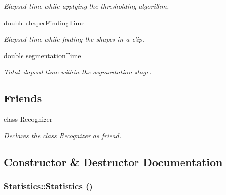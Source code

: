 \begin{CompactItemize}
\begin{CompactList}\small\item\em Elapsed time while applying the thresholding algorithm. \item\end{CompactList}\item 
\hypertarget{class_statistics_902172424d5011a89726319dfd32fa19}{
double \hyperlink{class_statistics_902172424d5011a89726319dfd32fa19}{shapesFindingTime\_\-}}
\label{class_statistics_902172424d5011a89726319dfd32fa19}

\begin{CompactList}\small\item\em Elapsed time while finding the shapes in a clip. \item\end{CompactList}\item 
\hypertarget{class_statistics_89ff84bd9b9b80585822c461ec25c8eb}{
double \hyperlink{class_statistics_89ff84bd9b9b80585822c461ec25c8eb}{segmentationTime\_\-}}
\label{class_statistics_89ff84bd9b9b80585822c461ec25c8eb}

\begin{CompactList}\small\item\em Total elapsed time within the segmentation stage. \item\end{CompactList}\end{CompactItemize}
\subsection*{Friends}
\begin{CompactItemize}
\item 
\hypertarget{class_statistics_11123fa51c07995419270030024a7dfe}{
class \hyperlink{class_statistics_11123fa51c07995419270030024a7dfe}{Recognizer}}
\label{class_statistics_11123fa51c07995419270030024a7dfe}

\begin{CompactList}\small\item\em Declares the class \hyperlink{class_recognizer}{Recognizer} as friend. \item\end{CompactList}\end{CompactItemize}


\subsection{Constructor \& Destructor Documentation}
\hypertarget{class_statistics_60ddd90a571ed4c3ce8c0f6317a36d63}{
\subsubsection[Statistics]{\setlength{\rightskip}{0pt plus 5cm}Statistics::Statistics ()}}
\label{class_statistics_60ddd90a571ed4c3ce8c0f6317a36d63}


